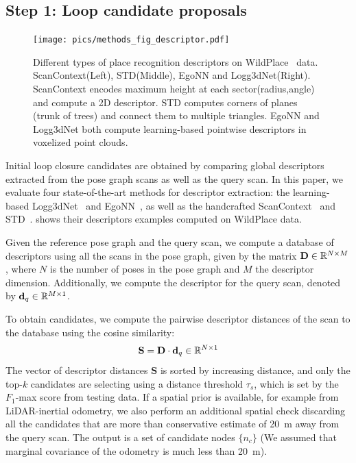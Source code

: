\subsection*{\textbf{Step 1: Loop candidate proposals}}
\label{subsubsec:loop-candidate}
\begin{figure}[htbp]
  \centering
  \texttt{[image: pics/methods\_fig\_descriptor.pdf]}
  \caption{Different types of place recognition descriptors on WildPlace~\cite{knights2023icra} data. ScanContext(Left), STD(Middle), EgoNN and Logg3dNet(Right). ScanContext encodes maximum height at each sector(radius,angle) and compute a 2D descriptor. STD computes corners of planes (trunk of trees) and connect them to multiple triangles. EgoNN and Logg3dNet both compute learning-based pointwise descriptors in voxelized point clouds.  }
  \label{fig:descriptors_example}
\end{figure}
Initial loop closure candidates are obtained by comparing global descriptors extracted from the pose graph scans as well as the query scan. In this paper, we evaluate four state-of-the-art methods for descriptor extraction: the learning-based Logg3dNet~\cite{vidanapathirana2022icra} and EgoNN~\cite{komorowski2022ral}, as well as the handcrafted ScanContext~\cite{kim2018iros} and STD~\cite{yuan2023icra}.  shows their descriptors examples computed on WildPlace data.  

Given the reference pose graph and the query scan, we compute a database of descriptors using all the scans in the pose graph, given by the matrix $\mathbf{D} \in \mathbb{R}^{N\times M}$, where $N$ is the number of poses in the pose graph and $M$ the descriptor dimension. Additionally, we compute the descriptor for the query scan, denoted by $\mathbf{d}_{q} \in \mathbb{R}^{M \times 1}$. 

To obtain candidates, we compute the pairwise descriptor distances of the scan to the database using the cosine similarity:
\begin{equation}
  \mathbf{S} = \mathbf{D} \cdot \mathbf{d}_{q} \in \mathbb{R}^{N \times 1}
\end{equation}
The vector of descriptor distances $\mathbf{S}$ is sorted by increasing distance, and only the top-$k$ candidates are selecting using a distance threshold $\tau_{s}$, which is set by the $F_1$-max score from testing data.
If a spatial prior is available, for example from LiDAR-inertial odometry, we also perform an additional spatial check discarding all the candidates that are more than conservative estimate of \SI{20}{\meter} away from the query scan. The output is a set of candidate nodes $\{ n_c\}$ (We assumed that marginal covariance of the odometry is much less than \SI{20}{\meter}).


